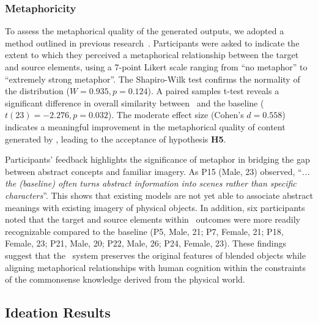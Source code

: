 \subsubsection{Metaphoricity}

To assess the metaphorical quality of the generated outputs, we adopted a method outlined in previous research~\cite{10.1007/978-0-85729-224-7_13}.
Participants were asked to indicate the extent to which they perceived a metaphorical relationship between the target and source elements, using a 7-point Likert scale ranging from ``no metaphor'' to ``extremely strong metaphor''.
The Shapiro-Wilk test confirms the normality of the distribution ($W = 0.935, p = 0.124$). 
A paired samples t-test reveals a significant difference in overall similarity between \sysname\ and the baseline ($t(23) = -2.276, p = 0.032$).
The moderate effect size (Cohen's $d = 0.558$) indicates a meaningful improvement in the metaphorical quality of content generated by \sysname, leading to the acceptance of hypothesis \textbf{H5}.

Participants' feedback highlights the significance of metaphor in bridging the gap between abstract concepts and familiar imagery.
As P15 (Male, 23) observed, ``\textit{... the (baseline) often turns abstract information into scenes rather than specific characters}''.
This shows that existing models are not yet able to associate abstract meanings with existing imagery of physical objects. 
In addition, six participants noted that the target and source elements within \sysname\ outcomes were more readily recognizable compared to the baseline (P5, Male, 21; P7, Female, 21; P18, Female, 23; P21, Male, 20; P22, Male, 26; P24, Female, 23).
These findings suggest that the \sysname\ system preserves the original features of blended objects while aligning metaphorical relationships with human cognition within the constraints of the commonsense knowledge derived from the physical world.





\subsection{Ideation Results}



